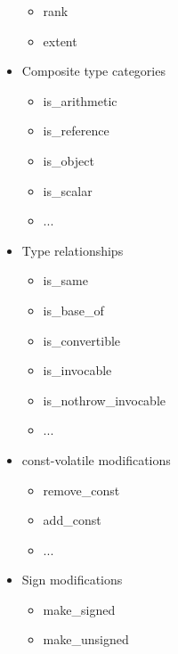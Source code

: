 \begin{itemize}
\begin{itemize}
\item
rank

\item
extent
\end{itemize}

\item
Composite type categories
\begin{itemize}
\item
is\_arithmetic

\item
is\_reference

\item
is\_object

\item
is\_scalar

\item
...
\end{itemize}

\item
Type relationships

\begin{itemize}
\item
is\_same

\item
is\_base\_of

\item
is\_convertible

\item
is\_invocable

\item
is\_nothrow\_invocable

\item
...
\end{itemize}

\item
const-volatile modifications

\begin{itemize}
\item
remove\_const

\item
add\_const

\item
...
\end{itemize}

\item
Sign modifications

\begin{itemize}
\item
make\_signed

\item
make\_unsigned
\end{itemize}


\end{itemize}
